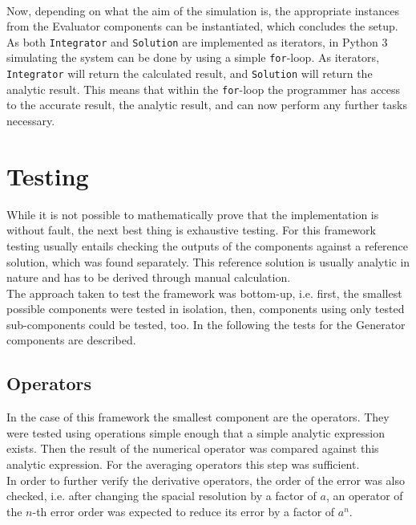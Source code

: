 \\
Now, depending on what the aim of the simulation is, the appropriate instances from the Evaluator components can be instantiated, which concludes the setup.
\\
As both \texttt{Integrator} and \texttt{Solution} are implemented as iterators, in Python 3 simulating the system can be done by using a simple \texttt{for}-loop.
As iterators, \texttt{Integrator} will return the calculated result, and \texttt{Solution} will return the analytic result.
This means that within the \texttt{for}-loop the programmer has access to the accurate result, the analytic result, and can now perform any further tasks necessary.

\section{Testing}
While it is not possible to mathematically prove that the implementation is without fault, the next best thing is exhaustive testing.
For this framework testing usually entails checking the outputs of the components against a reference solution, which was found separately.
This reference solution is usually analytic in nature and has to be derived through manual calculation.
\\
The approach taken to test the framework was bottom-up, i.e. first, the smallest possible components were tested in isolation, then, components using only tested sub-components could be tested, too.
In the following the tests for the Generator components are described.

\subsection{Operators}
In the case of this framework the smallest component are the operators.
They were tested using operations simple enough that a simple analytic expression exists.
Then the result of the numerical operator was compared against this analytic expression.
For the averaging operators this step was sufficient.
\\
In order to further verify the derivative operators, the order of the error was also checked, i.e. after changing the spacial resolution by a factor of $a$, an operator of the $n$-th error order was expected to reduce its error by a factor of $a^n$.

